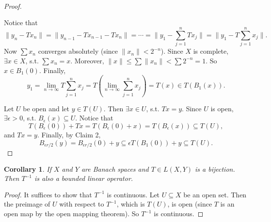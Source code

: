 \documentclass[12pt]{article}
\theoremstyle{plain}
\newtheorem*{corollary}{Corollary}
\theoremstyle{definition}
\begin{document}
\begin{proof}
\begin{description}
            Notice that 
            \[
                \|y_n - Tx_n\| = \|y_{n-1} - Tx_{n-1} - Tx_n\| = \cdots = \|y_1 - \sum_{j=1}^n Tx_j\| = \|y_1 -
                T\sum_{j=1}^n x_j\|.
            \]
            Now $\sum x_n$ converges absolutely (since $\|x_n\|<2^{-n}$).
            Since $X$ is complete, $\exists x\in X$, s.t. $\sum x_n = x$.
            Moreover, $\|x\|\leq \sum \|x_n\| < \sum 2^{-n} = 1$.
            So $x\in B_1(0)$.
            Finally,
            \[
                y_1 = \lim_{n\rightarrow\infty} T\sum_{j=1}^n x_j = T(\lim_{n\rightarrow\infty} \sum_{j=1}^n x_j) = T(x)
                \in T(B_1(x)).
            \]
    \end{description}
    Let $U$ be open and let $y\in T(U)$.
    Then $\exists x\in U$, s.t. $Tx=y$.
    Since $U$ is open, $\exists \epsilon > 0$, s.t. $B_\epsilon(x)\subseteq U$.
    Notice that
    \[
        T(B_{\epsilon}(0)) + Tx = T(B_{\epsilon}(0) + x) = T(B_\epsilon(x)) \subseteq T(U),
    \]
    and $Tx=y$.
    Finally, by Claim 2, 
    \[
        B_{\epsilon r/2}(y) = B_{\epsilon r/2}(0) + y \subseteq \epsilon T(B_1(0)) + y \subseteq T(U).
    \]
\end{proof}

\begin{corollary}
    If $X$ and $Y$ are Banach spaces and $T\in L(X,Y)$ is a bijection.
    Then $T^{-1}$ is also a bounded linear operator.
\end{corollary}
\begin{proof}
    It suffices to show that $T^{-1}$ is continuous.
    Let $U\subseteq X$ be an open set.
    Then the preimage of $U$ with respect to $T^{-1}$, which is $T(U)$, is open (since $T$ is an open map by the open mapping theorem).
    So $T^{-1}$ is continuous.
\end{proof}
\end{document}

